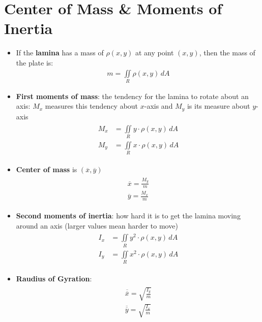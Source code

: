 \documentclass{article}
\begin{document}
\section{Center of Mass \& Moments of Inertia}
\begin{itemize}
  \item If the \textbf{lamina} has a mass of $\rho (x,y)$ at any point $(x,y)$, then the mass of the plate is:
  \begin{align}
    m = \iint\limits_R \rho (x,y) \, dA
  \end{align}
  \item \textbf{First moments of mass}: the tendency for the lamina to rotate about an axis: $M_x$ measures this tendency about $x$-axis and $M_y$ is its measure about $y$-axis
  \begin{align}
    \begin{split}
      M_x &= \iint\limits_R y\cdot\rho (x,y) \, dA \\
      M_y &= \iint\limits_R x\cdot\rho (x,y) \, dA
    \end{split}
  \end{align}
  \item \textbf{Center of mass} is $(\overline{x},\overline{y})$
  \begin{align}
    \begin{split}
      \overline{x} = \frac{M_y}{m} \\
      \overline{y} = \frac{M_x}{m}
    \end{split}
  \end{align}
  \item \textbf{Second moments of inertia}: how hard it is to get the lamina moving around an axis (larger values mean harder to move)
  \begin{align}
    \begin{split}
      I_x &= \iint\limits_R y^2 \cdot\rho (x,y) \, dA \\
      I_y &= \iint\limits_R x^2 \cdot\rho (x,y) \, dA
    \end{split}
  \end{align}
  \item \textbf{Raudius of Gyration}:
  \begin{align}
    \begin{split}
      \overline{\overline{x}} = \sqrt{\frac{I_y}{m}} \\
      \overline{\overline{y}} = \sqrt{\frac{I_x}{m}}
    \end{split}
  \end{align}
\end{itemize}
\end{document}
